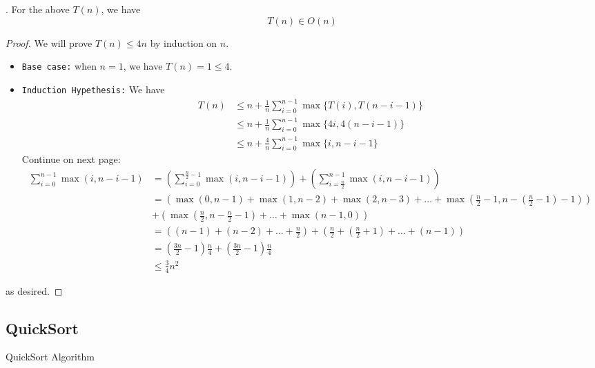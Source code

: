 \documentclass{article}
\begin{document}
\begin{thmm}[].
    For the above $T(n)$, we have 
    \[ T(n) \in O(n) \]
\end{thmm}

\begin{proof}
    We will prove $T(n) \leq 4 n$ by induction on $n$. 
    \begin{itemize}
        \item \texttt{Base case:} when $n = 1$, we have $T(n) = 1 \leq 4$. 
        \item \texttt{Induction Hypethesis:} We have \begin{align*}
            T(n)
            & \leq n + \frac{1}{n} \sum_{i=0}^{n-1} \max\{T(i), T(n-i-1)\} \\
            & \leq n + \frac{1}{n} \sum_{i=0}^{n-1} \max\{4i, 4(n-i-1)\} \\
            & \leq n + \frac{4}{n} \sum_{i=0}^{n-1} \max\{i, n-i-1\}
        \end{align*}
        Continue on next page: \begin{align*}
            \sum_{i=0}^{n-1} \max(i, n-i-1) 
            & = \left( \sum_{i=0}^{\frac{n}{2}-1} \max(i, n-i-1) \right) + \left( \sum_{i=\frac{n}{2}}^{n-1} \max(i, n-i-1) \right) \\
            & = \left( \max(0, n-1) + \max(1, n-2) + \max(2, n-3) + \ldots + \max\left(\frac{n}{2}-1, n - \left(\frac{n}{2}-1\right) - 1\right) \right) \\ 
            & + \left( \max\left(\frac{n}{2}, n - \frac{n}{2} - 1\right) + \ldots + \max(n-1, 0) \right) \\ 
            & = \left( (n-1) + (n-2) + \ldots + \frac{n}{2} \right) + \left( \frac{n}{2} + (\frac{n}{2}+1) + \ldots + (n-1) \right) \\
            & = \left(\frac{3n}{2} - 1\right) \frac{n}{4} + \left(\frac{3n}{2} - 1\right) \frac{n}{4} \\ 
            & \leq \frac{3}{4} n^2
        \end{align*}
    \end{itemize}
    as desired. 
\end{proof}

\subsection{QuickSort} 

\begin{algorithm}[H]
    \DontPrintSemicolon  %
    \caption{QuickSort Algorithm}
    
    
\end{algorithm}
\end{document}
